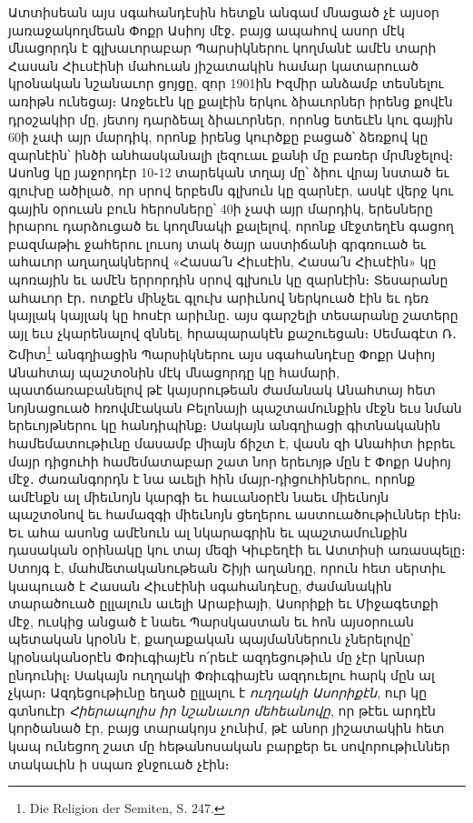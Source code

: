 \documentclass{article}
\begin{document}
{Ատտիսեան այս սգահանդէսին հետքն անգամ մնացած չէ այսօր յառաջակողմեան Փոքր Ասիոյ մէջ․ բայց ապահով ասոր մէկ մնացորդն է գլխաւորաբար Պարսիկներու կողմանէ ամէն տարի Հասան Հիւսէինի մահուան յիշատակին համար կատարուած կրօնական նշանաւոր ցոյցը, զոր 1901ին Իզմիր անձամբ տեսնելու առիթն ունեցայ։ Առջեւէն կը քալէին երկու ձիաւորներ իրենց քովէն դրօշակիր մը, յետոյ դարձեալ ձիաւորներ, որոնց ետեւէն կու գային 60ի չափ այր մարդիկ, որոնք իրենց կուրծքը բացած՝ ձեռքով կը զարնէին՝ ինծի անհասկանալի լեզուաւ քանի մը բառեր մրմնջելով։ Ասոնց կը յաջորդէր 10֊12 տարեկան տղայ մը՝ ձիու վրայ նստած եւ գլուխը ածիլած, որ սրով երբեմն գլխուն կը զարնէր, ասկէ վերջ կու գային օրուան բուն հերոսները՝ 40ի չափ այր մարդիկ, երեսները իրարու դարձուցած եւ կողմնակի քալելով, որոնք մէջտեղէն գացող բազմաթիւ ջահերու լուսոյ տակ ծայր աստիճանի գրգռուած եւ ահաւոր աղաղակներով «Հասա՛ն Հիւսէին, Հասա՛ն Հիւսէին» կը պոռային եւ ամէն երրորդին սրով գլխուն կը զարնէին։ Տեսարանը ահաւոր էր․ ոտքէն մինչեւ գլուխ արիւնով ներկուած էին եւ դեռ կայլակ կայլակ կը հոսէր արիւնը․ այս գարշելի տեսարանը շատերը այլ եւս չկարենալով զննել, հրապարակէն քաշուեցան։ Սեմագէտ Ռ․ Շմիտ\footnote{Die Religion der Semiten, S. 247.} անգղիացին Պարսիկներու այս սգահանդէսը Փոքր Ասիոյ Անահտայ պաշտօնին մէկ մնացորդը կը համարի, պատճառաբանելով թէ կայսրութեան ժամանակ Անահտայ հետ նոյնացուած հռովմէական Բելոնայի պաշտամունքին մէջն եւս նման երեւոյթներու կը հանդիպինք։ Սակայն անգղիացի գիտնականին համեմատութիւնը մասամբ միայն ճիշտ է, վասն զի Անահիտ իբրեւ մայր դիցուհի համեմատաբար շատ նոր երեւոյթ մըն է Փոքր Ասիոյ մէջ․ ժառանգորդն է նա աւելի հին մայր֊դիցուհիներու, որոնք ամէնքն ալ միեւնոյն կարգի եւ հաւանօրէն նաեւ միեւնոյն պաշտօնով եւ համազգի միեւնոյն ցեղերու աստուածութիւններ էին։ Եւ ահա ասոնց ամէնուն ալ նկարագրին եւ պաշտամունքին դասական օրինակը կու տայ մեզի Կիւբեղէի եւ Ատտիսի առասպելը։ Ստոյգ է, մահմետականութեան Շիյի աղանդը, որուն հետ սերտիւ կապուած է Հասան Հիւսէինի սգահանդէսը, ժամանակին տարածուած ըլլալուն աւելի Արաբիայի, Ասորիքի եւ Միջագետքի մէջ, ուսկից անցած է նաեւ Պարսկաստան եւ հոն այսօրուան պետական կրօնն է, քաղաքական պայմաններուն չներելովը՝ կրօնականօրէն Փռիւգիայէն ո՛րեւէ ազդեցութիւն մը չէր կրնար ընդունիլ։ Սակայն ուղղակի Փռիւգիայէն ազդուելու հարկ մըն ալ չկար։ Ազդեցութիւնը եղած ըլլալու է \emph{ուղղակի Ասորիքէն}, ուր կը գտնուէր \emph{Հիերապոլիս իր նշանաւոր մեհեանովը}, որ թէեւ արդէն կործանած էր, բայց տարակոյս չունիմ, թէ անոր յիշատակին հետ կապ ունեցող շատ մը հեթանոսական բարքեր եւ սովորութիւններ տակաւին ի սպառ ջնջուած չէին։

}
\end{document}
